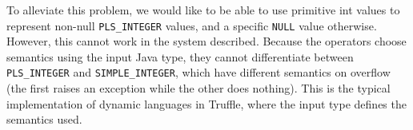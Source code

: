 \documentclass[twoside,11pt,a4paper]{article}
\newcommand{\maybe}[1]{\textit{(maybe ? #1)}}
\newcommand{\java}[1]{\textsf{#1}}
\newcommand{\pls}[1]{\texttt{#1}}
\newcommand{\plstype}[1]{\pls{#1}}
\newcommand{\plsi}{\plstype{PLS\_INTEGER}}
\newcommand{\simpleint}{\plstype{SIMPLE\_INTEGER}}
\newcommand{\plsnull}{\pls{NULL}}
\begin{document}

To alleviate this problem, we would like to be able to use primitive \java{int} values to represent non-null \plsi{} values, and a specific \plsnull{} value otherwise. However, this cannot work in the system described. Because the operators choose semantics using the input Java type, they cannot differentiate between \plsi{} and \simpleint{}, which have different semantics on overflow (the first raises an exception while the other does nothing). This is the typical implementation of dynamic languages in Truffle, where the input type defines the semantics used.
\end{document}
